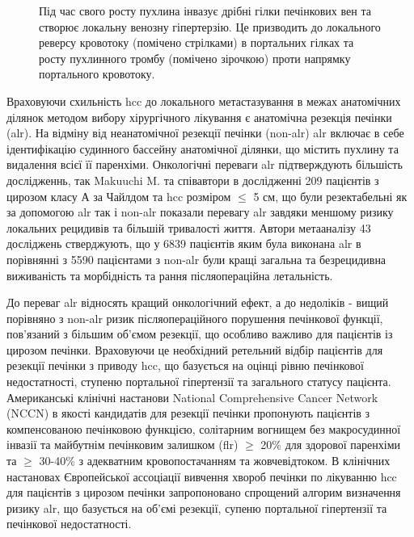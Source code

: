 \begin{refsection}
\begin{figure}[htbp]
\medskip
\small
Під час свого росту пухлина інвазує дрібні гілки печінкових вен та створює локальну венозну гіпертерзію. Це призводить до локального реверсу кровотоку (помічено стрілками) в портальних гілках та росту пухлинного тромбу (помічено зірочкою) проти напрямку портального кровотоку.

\end{figure}




Враховуючи схильність \acrshort{hcc} до локального метастазування в межах анатомічних ділянок методом вибору хірургічного лікування є анатомічна резекція печінки (\acrshort{alr}). На відміну від неанатомічної резекції печінки (\acrshort{non-alr}) \acrshort{alr} включає в себе ідентифікацію судинного бассейну анатомічної ділянки, що містить пухлину та видалення всієї її паренхіми. Онкологічні переваги \acrshort{alr} підтверждують більшість дослідженнь, так Makuuchi M. та співавтори \cite{Shindoh2016} в дослідженні 209 пацієнтів з цирозом класу А за Чайлдом та \acrshort{hcc} розміром $\leq$ 5 см, що були резектабельні як за допомогою \acrshort{alr} так і \acrshort{non-alr} показали перевагу \acrshort{alr} завдяки меншому ризику локальних рецидивів та більшій тривалості життя. Автори метааналізу \cite{Moris2018} 43 досліджень стверджують, що у 6839 пацієнтів яким була виконана \acrshort{alr} в порівнянні з 5590 пацієнтами з \acrshort{non-alr} були кращі загальна та безрецидивна виживаність та морбідність та рання післяопераційна летальність.

До переваг \acrshort{alr} відносять кращий онкологічний ефект, а до недоліків - вищий порівняно з \acrshort{non-alr} ризик післяопераційного порушення печінкової функції, пов'язаний з більшим об'ємом резекції, що особливо важливо для пацієнтів із цирозом печінки. Враховуючи це необхідний ретельний відбір пацієнтів для резекції печінки з приводу \acrshort{hcc}, що базується на оцінці рівню печінкової недостатності, ступеню портальної гіпертензії та загального статусу пацієнта. Американські клінічні настанови National Comprehensive Cancer Network (\acrshort{NCCN}) в якості кандидатів для резекції печінки пропонують пацієнтів з компенсованою печінковою функцією, солітарним вогнищем без макросудинної інвазії та майбутнім печінковим залишком (\acrshort{flr}) $\geq$ 20\% для здорової паренхіми та $\geq$ 30-40\% з адекватним кровопостачанням та жовчевідтоком. В клінічних настановах Європейської ассоціації вивчення хвороб печінки по лікуванню \acrshort{hcc} \cite{Galle2018a} для пацієнтів з цирозом печінки запропоновано спрощений алгорим визначення ризику \acrshort{alr}, що базується на об'ємі резекції, супеню портальної гіпертензії та печінкової недостатності. 



\end{refsection}

